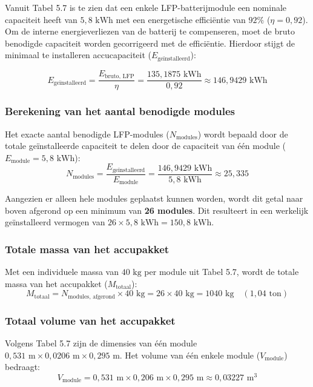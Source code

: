 Vanuit Tabel 5.7 is te zien dat een enkele LFP-batterijmodule een nominale capaciteit heeft van $5{,}8 \text{ kWh}$ met een energetische efficiëntie van $92\%$ ($\eta = 0{,}92$).  Om de interne energieverliezen van de batterij te compenseren, moet de bruto benodigde capaciteit worden gecorrigeerd met de efficiëntie. Hierdoor stijgt de minimaal te installeren accucapaciteit ($E_{\text{geïnstalleerd}}$):

\begin{equation}
E_{\text{geïnstalleerd}} = \frac{E_{\text{bruto, LFP}}}{\eta} = \frac{135{,}1875 \text{ kWh}}{0{,}92} \approx 146{,}9429 \text{ kWh}
\end{equation}

\subsubsection*{Berekening van het aantal benodigde modules}
Het exacte aantal benodigde LFP-modules ($N_{\text{modules}}$) wordt bepaald door de totale geïnstalleerde capaciteit te delen door de capaciteit van één module ($E_{\text{module}} = 5{,}8 \text{ kWh}$):
\begin{equation}
N_{\text{modules}} = \frac{E_{\text{geïnstalleerd}}}{E_{\text{module}}} = \frac{146{,}9429 \text{ kWh}}{5{,}8 \text{ kWh}} \approx 25{,}335
\end{equation}

\noindent Aangezien er alleen hele modules geplaatst kunnen worden, wordt dit getal naar boven afgerond op een minimum van \textbf{26 modules}. Dit resulteert in een werkelijk geïnstalleerd vermogen van $26 \times 5{,}8 \text{ kWh} = 150{,}8 \text{ kWh}$.

\subsubsection*{Totale massa van het accupakket}
Met een individuele massa van $40 \text{ kg}$ per module uit Tabel 5.7, wordt de totale massa van het accupakket ($M_{\text{totaal}}$):
\begin{equation}
M_{\text{totaal}} = N_{\text{modules, afgerond}} \times 40 \text{ kg} = 26 \times 40 \text{ kg} = 1040 \text{ kg} \quad (1{,}04 \text{ ton})
\end{equation}

\subsubsection*{Totaal volume van het accupakket}
Volgens Tabel 5.7 zijn de dimensies van één module $0{,}531 \text{ m} \times 0{,}0206 \text{ m} \times 0{,}295 \text{ m}$. Het volume van één enkele module ($V_{\text{module}}$) bedraagt:
\begin{equation}
V_{\text{module}} = 0{,}531 \text{ m} \times 0{,}206 \text{ m} \times 0{,}295 \text{ m} \approx 0{,}03227 \text{ m}^3
\end{equation}

